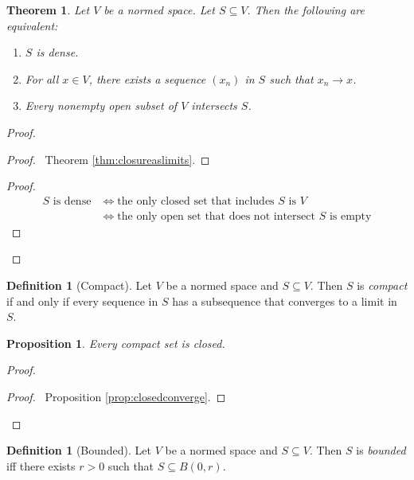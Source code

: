\documentclass{book}
\let\qed\relax
\newtheorem{prop}[ax]{Proposition}
\newtheorem{thm}[ax]{Theorem}
\theoremstyle{definition}
\newtheorem{df}[ax]{Definition}
\begin{document}
\begin{thm}
Let $V$ be a normed space. Let $S \subseteq V$. Then the following are equivalent:
\begin{enumerate}
\item $S$ is dense.
\item For all $x \in V$, there exists a sequence $(x_n)$ in $S$ such that $x_n \rightarrow x$.
\item Every nonempty open subset of $V$ intersects $S$.
\end{enumerate}
\end{thm}

\begin{proof}
\pf
{}
\begin{proof}
	\pf\ Theorem \ref{thm:closureaslimits}.
\end{proof}
\begin{proof}
	\pf
	\begin{align*}
	S \text{ is dense} & \Leftrightarrow \text{the only closed set that includes $S$ is $V$} \\
	& \Leftrightarrow \text{the only open set that does not intersect $S$ is empty}
	\end{align*}
\end{proof}
\qed
\end{proof}

\begin{df}[Compact]
Let $V$ be a normed space and $S \subseteq V$. Then $S$ is \emph{compact} if and only if every sequence in $S$ has a subsequence that converges to a limit in $S$.
\end{df}

\begin{prop}
\label{prop:compactclosed}
Every compact set is closed.
\end{prop}

\begin{proof}
\pf
{}
\qedstep
\begin{proof}
	\pf\ Proposition \ref{prop:closedconverge}.
\end{proof}
\qed
\end{proof}

\begin{df}[Bounded]
Let $V$ be a normed space and $S \subseteq V$. Then $S$ is \emph{bounded} iff there exists $r > 0$ such that $S \subseteq B(0,r)$.
\end{df}
\end{document}
